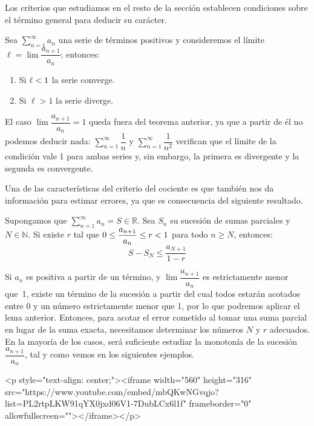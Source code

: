 Los criterios que estudiamos en el resto de la sección establecen condiciones sobre el término general para deducir su carácter.

\begin{corolario}\label{T-cociente}
Sea $\displaystyle\sum_{n=1}^\infty  a_n$ una serie de términos positivos y
consideremos el límite $\ell=\lim\dfrac{a_{n+1}}{a_n}$; entonces:
\begin{enumerate}
\item Si $\ell < 1$ la serie converge.
\item Si $\ell >1$ la serie diverge.
\end{enumerate}
\end{corolario}

El caso $\lim\dfrac{a_{n+1}}{a_n} =1$ queda fuera del teorema anterior, ya que a partir de él no podemos deducir nada: $\displaystyle\sum_{n=1}^\infty   \dfrac{1}{n}$ y $\displaystyle\sum_{n=1}^\infty   \dfrac{1}{n^2}$ verifican que el límite de la condición vale 1 para ambas series y, sin embargo, la primera es divergente y la segunda es convergente.

Una de las características del criterio del cociente es que también nos da información para estimar errores, ya que es consecuencia del siguiente resultado.

\begin{lema}\label{T-coc-aprox}
Supongamos que $\displaystyle\sum_{n=1}^\infty  a_n=S\in\mathbb{R}$. Sea $S_n$ su sucesión de sumas parciales y $N\in\mathbb{N}$.
Si existe $r$ tal que $0\le\dfrac{a_{n+1}}{a_n}\le r < 1$ para todo $n\ge N$, entonces:
\[
S-S_N\leq \dfrac{a_{N+1}}{1-r}
\]
\end{lema}

Si $a_n$ es positiva a partir de un término, y $\lim\dfrac{a_{n+1}}{a_n}$ es estrictamente menor que~1, existe un término de la sucesión a partir del cual todos estarán acotados entre 0 y un número estrictamente menor que 1, por lo que podremos aplicar el lema anterior.
Entonces, para acotar el error cometido al tomar una suma parcial en lugar de la suma exacta, necesitamos determinar los números $N$ y $r$ adecuados.
En la mayoría de los casos, será suficiente estudiar la monotonía de la sucesión $\dfrac{a_{n+1}}{a_n}$, tal y como vemos en los siguientes ejemplos.

\begin{rawhtml}
<p style="text-align: center;"><iframe width="560" height="316" src="https://www.youtube.com/embed/mbQKwNGvqjo?list=PL2rtpLKW91qYX0jxd06V1-7DubLCx6l1f" frameborder="0" allowfullscreen=""></iframe></p>
\end{rawhtml}

